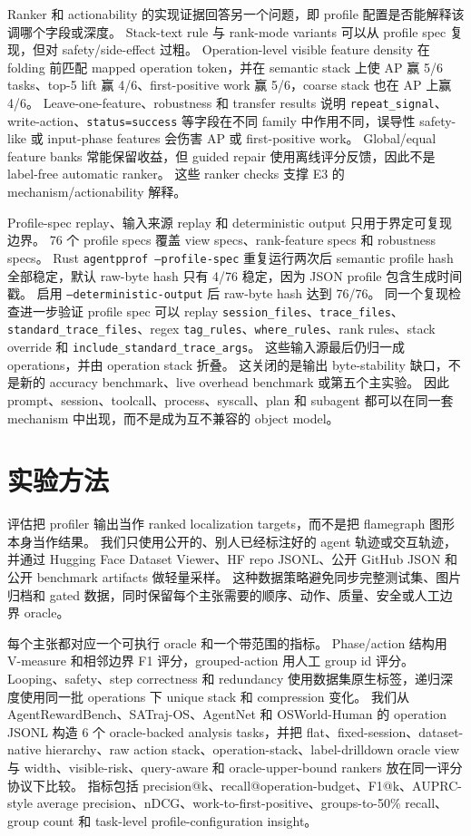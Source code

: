 \documentclass[10pt,twocolumn]{ctexart}
\begin{document}
Ranker 和 actionability 的实现证据回答另一个问题，即 profile 配置是否能解释该调哪个字段或深度。
Stack-text rule 与 rank-mode variants 可以从 profile spec 复现，但对 safety/side-effect 过粗。
Operation-level visible feature density 在 folding 前匹配 mapped operation token，并在 semantic stack 上使 AP 赢 5/6 tasks、top-5 lift 赢 4/6、first-positive work 赢 5/6，coarse stack 也在 AP 上赢 4/6。
Leave-one-feature、robustness 和 transfer results 说明 \texttt{repeat\_signal}、write-action、\texttt{status=success} 等字段在不同 family 中作用不同，误导性 safety-like 或 input-phase features 会伤害 AP 或 first-positive work。
Global/equal feature banks 常能保留收益，但 guided repair 使用离线评分反馈，因此不是 label-free automatic ranker。
这些 ranker checks 支撑 E3 的 mechanism/actionability 解释。

Profile-spec replay、输入来源 replay 和 deterministic output 只用于界定可复现边界。
76 个 profile specs 覆盖 view specs、rank-feature specs 和 robustness specs。
Rust \texttt{agentpprof --profile-spec} 重复运行两次后 semantic profile hash 全部稳定，默认 raw-byte hash 只有 4/76 稳定，因为 JSON profile 包含生成时间戳。
启用 \texttt{--deterministic-output} 后 raw-byte hash 达到 76/76。
同一个复现检查进一步验证 profile spec 可以 replay \texttt{session\_files}、\texttt{trace\_files}、\texttt{standard\_trace\_files}、regex \texttt{tag\_rules}、\texttt{where\_rules}、rank rules、stack override 和 \texttt{include\_standard\_trace\_args}。
这些输入源最后仍归一成 operations，并由 operation stack 折叠。
这关闭的是输出 byte-stability 缺口，不是新的 accuracy benchmark、live overhead benchmark 或第五个主实验。
因此 prompt、session、toolcall、process、syscall、plan 和 subagent 都可以在同一套 mechanism 中出现，而不是成为互不兼容的 object model。

\section{实验方法}

评估把 profiler 输出当作 ranked localization targets，而不是把 flamegraph 图形本身当作结果。
我们只使用公开的、别人已经标注好的 agent 轨迹或交互轨迹，并通过 Hugging Face Dataset Viewer、HF repo JSONL、公开 GitHub JSON 和公开 benchmark artifacts 做轻量采样。
这种数据策略避免同步完整测试集、图片归档和 gated 数据，同时保留每个主张需要的顺序、动作、质量、安全或人工边界 oracle。

每个主张都对应一个可执行 oracle 和一个带范围的指标。
Phase/action 结构用 V-measure 和相邻边界 F1 评分，grouped-action 用人工 group id 评分。
Looping、safety、step correctness 和 redundancy 使用数据集原生标签，递归深度使用同一批 operations 下 unique stack 和 compression 变化。
我们从 AgentRewardBench、SATraj-OS、AgentNet 和 OSWorld-Human 的 operation JSONL 构造 6 个 oracle-backed analysis tasks，并把 flat、fixed-session、dataset-native hierarchy、raw action stack、operation-stack、label-drilldown oracle view 与 width、visible-risk、query-aware 和 oracle-upper-bound rankers 放在同一评分协议下比较。
指标包括 precision@k、recall@operation-budget、F1@k、AUPRC-style average precision、nDCG、work-to-first-positive、groups-to-50\% recall、group count 和 task-level profile-configuration insight。
\end{document}
